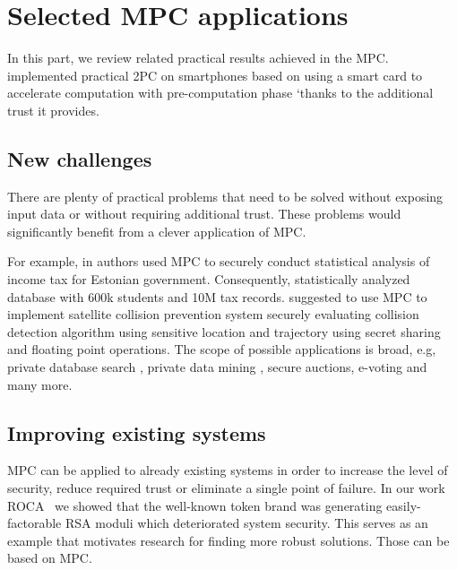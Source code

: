 \documentclass[
  digital, %
  twoside, %
  table,   %
  lof,     %
  lot,     %
]{fithesis3}
\theoremstyle{definition}
\theoremstyle{remark}
\begin{document}
\section{Selected MPC applications}\label{sec:soa:applications}
In this part, we review related practical results achieved in the MPC.
\cite{DSZ14} implemented practical 2PC on smartphones based on \cite{GMW87} using a smart card to accelerate computation with pre-computation phase `thanks to the additional trust it provides.

\subsection{New challenges} %
There are plenty of practical problems that need to be solved without exposing input data or without requiring additional trust. These problems would significantly benefit from a clever application of MPC.

For example, in \cite{BJSV15} authors used MPC to securely conduct statistical analysis of income tax for Estonian government. Consequently, \cite{BKKRST16} statistically analyzed database with 600k students and 10M tax records. \cite{KW15} suggested to use MPC to implement satellite collision prevention system securely evaluating collision detection algorithm using sensitive location and trajectory using secret sharing and floating point operations. The scope of possible applications is broad, e.g,  private database search \cite{Bertino2005, Naor:1999:PPA:336992.337028}, private data mining \cite{Aldeen2015}, secure auctions, e-voting and many more.

\subsection{Improving existing systems}
MPC can be applied to already existing systems in order to increase the level of security, reduce required trust or eliminate a single point of failure.
In our work ROCA~\cite{2017-ccs-nemec} we showed that the well-known token brand was generating easily-factorable RSA moduli which deteriorated system security. This serves as an example that motivates research for finding more robust solutions. Those can be based on MPC.
    
\end{document}
